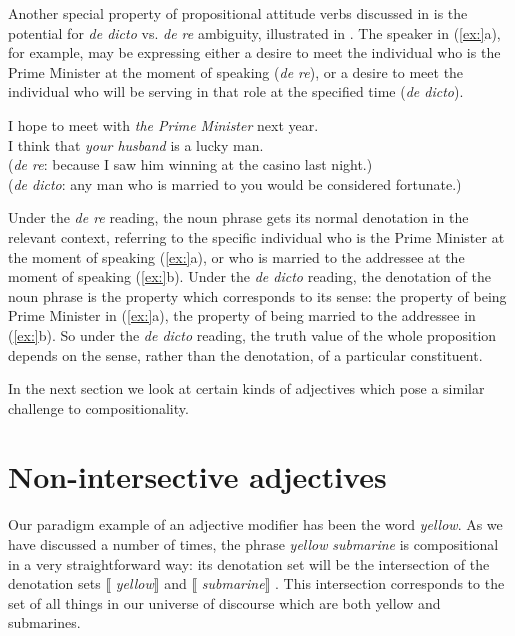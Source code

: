 Another special property of propositional attitude verbs discussed in  is the potential for \textit{de dicto} vs. \textit{de re} ambiguity, illustrated in . The speaker in (\ref{ex:}a), for example, may be expressing either a desire to meet the individual who is the Prime Minister at the moment of speaking (\textit{de re}), or a desire to meet the individual who will be serving in that role at the specified time (\textit{de dicto}).


\ea
\ea I hope to meet with \textit{the Prime Minister} next year.\\
\ex I think that \textit{your husband} is a lucky man.\\
  (\textit{de re}: because I saw him winning at the casino last night.)\\
  (\textit{de dicto}: any man who is married to you would be considered fortunate.)
                       \z
\z


Under the \textit{de re} reading, the noun phrase gets its normal denotation in the relevant context, referring to the specific individual who is the Prime Minister at the moment of speaking (\ref{ex:}a), or who is married to the addressee at the moment of speaking (\ref{ex:}b). Under the \textit{de dicto} reading, the denotation of the noun phrase is the property which corresponds to its sense: the property of being Prime Minister in (\ref{ex:}a), the property of being married to the addressee in (\ref{ex:}b). So under the \textit{de dicto} reading, the truth value of the whole proposition depends on the sense, rather than the denotation, of a particular constituent.



In the next section we look at certain kinds of adjectives which pose a similar challenge to compositionality.


\section{Non-intersective adjectives}\label{sec:} %

Our paradigm example of an adjective modifier has been the word \textit{yellow}. As we have discussed a number of times, the phrase \textit{yellow} \textit{submarine} is compositional in a very straightforward way: its denotation set will be the intersection of the denotation sets $\llbracket$ \textit{yellow}$\rrbracket$  and $\llbracket$ \textit{submarine}$\rrbracket$ . This intersection corresponds to the set of all things in our universe of discourse which are both yellow and submarines.



